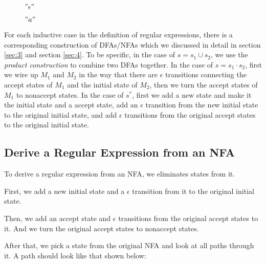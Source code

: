 \documentclass[11pt]{article}
\begin{document}
\begin{figure}[ht]
    \centering
    \caption{$"\epsilon"$}
    \label{fig:fig21}
\end{figure}

\begin{figure}[ht]
    \centering
    \caption{$"a"$}
    \label{fig:fig22}
\end{figure}

For each inductive case in the definition of regular expressions, there is
a corresponding construction of DFAs/NFAs which we discussed in detail in
section \ref{sec:3} and section \ref{sec:4}. To be specific, in the case of
$s = s_1 \cup s_2$, we use the \emph{product construction} to combine two
DFAs together. In the case of $s = s_1 \cdot s_2$, first we wire up $M_1$
and $M_2$ in the way that there are $\epsilon$ transitions connecting the
accept states of $M_1$ and the initial state of $M_2$, then we turn the
accept states of $M_1$ to nonaccept states. In the case of $s^\ast$, first
we add a new state and make it the initial state and a accept state, add
an $\epsilon$ transition from the new initial state to the original initial
state, and add $\epsilon$ transitions from the original accept states to
the original initial state.

\subsection{Derive a Regular Expression from an NFA}

To derive a regular expression from an NFA, we eliminates states from it.

First, we add a new initial state and a $\epsilon$ transition from it to
the original initial state.

Then, we add an accept state and $\epsilon$ transitions from the original
accept states to it. And we turn the original accept states to nonaccept
states.

After that, we pick a state from the original NFA and look at all paths
through it. A path should look like that shown below:
\end{document}
